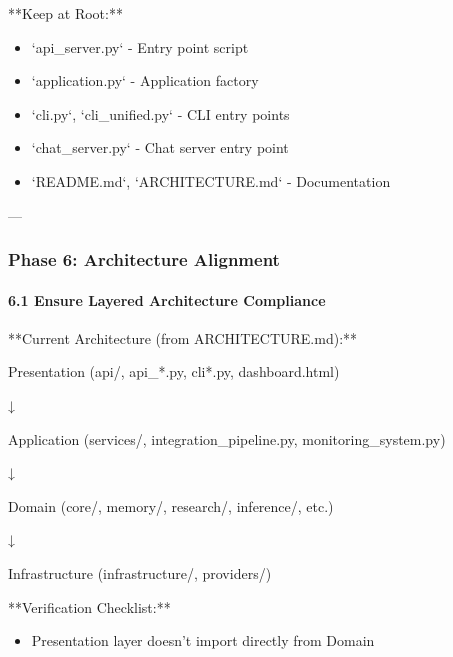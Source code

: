 \documentclass[11pt,a4paper]{article}
\begin{document}
**Keep at Root:**

\begin{itemize}
\item `api_server.py` - Entry point script
\end{itemize}

\begin{itemize}
\item `application.py` - Application factory
\end{itemize}

\begin{itemize}
\item `cli.py`, `cli_unified.py` - CLI entry points
\end{itemize}

\begin{itemize}
\item `chat_server.py` - Chat server entry point
\end{itemize}

\begin{itemize}
\item `README.md`, `ARCHITECTURE.md` - Documentation
\end{itemize}

---

\subsubsection{Phase 6: Architecture Alignment}

\paragraph{6.1 Ensure Layered Architecture Compliance}

**Current Architecture (from ARCHITECTURE.md):**

Presentation (api/, api\_*.py, cli*.py, dashboard.html)

    ↓

Application (services/, integration\_pipeline.py, monitoring\_system.py)

    ↓

Domain (core/, memory/, research/, inference/, etc.)

    ↓

Infrastructure (infrastructure/, providers/)

**Verification Checklist:**

\begin{itemize}
\item [ ] Presentation layer doesn't import directly from Domain
\end{itemize}
\end{document}
